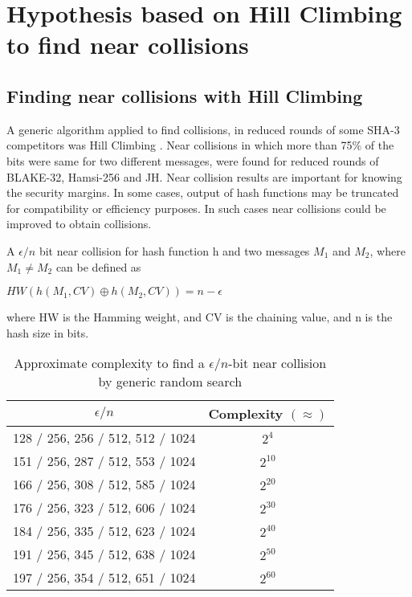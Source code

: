 \chapter{Hypothesis based on Hill Climbing to find near collisions}


\section{Finding near collisions with Hill Climbing}

A generic algorithm applied to find collisions, in reduced rounds of some SHA-3 competitors was Hill Climbing
\cite{00029}. Near collisions in which more than 75\% of the bits were same for two different messages, were found 
for reduced rounds of BLAKE-32, Hamsi-256 and JH. Near collision results are important for knowing the security
margins. In some cases, output of hash functions may be truncated for compatibility or efficiency purposes. In 
such cases near collisions could be improved to obtain collisions.

A $\epsilon / n $ bit near collision for hash function h and two messages $M_{1}$ and $M_{2}$, where $M_{1} \neq M_{2}$ can be 
defined as

$HW( h( M_{1}, CV ) \oplus h( M_{2}, CV ) ) = n - \epsilon $

where HW is the Hamming weight, and CV is the chaining value, and n is the hash size in bits.

\begin{table}[h]
  \begin{center}
    \begin{tabular}{ | c | c | } \hline
      $\epsilon / n $                         & Complexity $( \approx )$ \\ \hline
      128 / 256, 256 / 512, 512 / 1024 & $2^{4}$ \\ \hline
      151 / 256, 287 / 512, 553 / 1024 & $2^{10}$ \\ \hline
      166 / 256, 308 / 512, 585 / 1024 & $2^{20}$ \\ \hline
      176 / 256, 323 / 512, 606 / 1024 & $2^{30}$ \\ \hline
      184 / 256, 335 / 512, 623 / 1024 & $2^{40}$ \\ \hline
      191 / 256, 345 / 512, 638 / 1024 & $2^{50}$ \\ \hline
      197 / 256, 354 / 512, 651 / 1024 & $2^{60}$ \\ \hline
    \end{tabular}
    \caption{Approximate complexity to find a $\epsilon / n$-bit near collision by generic random search}
  \end{center}
\end{table}

